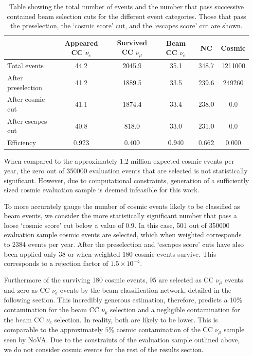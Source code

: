 \begin{table}
    \begin{tabular}{lccccc}
                           & Appeared CC $\nu_{e}$ & Survived CC $\nu_{\mu}$ & Beam CC $\nu_{e}$ & NC    & Cosmic  \\
        \midrule
        Total events       & 44.2                  & 2045.9                  & 35.1              & 348.7 & 1211000 \\
        After preselection & 41.2                  & 1889.5                  & 33.5              & 239.6 & 249260  \\
        After cosmic cut   & 41.1                  & 1874.4                  & 33.4              & 238.0 & 0.0     \\
        After escapes cut  & 40.8                  & 818.0                   & 33.0              & 231.0 & 0.0     \\
        \midrule
        Efficiency         & 0.923                 & 0.400                   & 0.940             & 0.662 & 0.000   \\
    \end{tabular}
    \caption[Number of events passing basic cuts for each event category.]
    {Table showing the total number of events and the number that pass successive contained beam
        selection cuts for the different event categories. Those that pass the preselection, the
        `cosmic score' cut, and the `escapes score' cut are shown.}
    \label{tab:selection}
\end{table}

When compared to the approximately 1.2 million expected cosmic events per year, the zero out of
350000 evaluation events that are selected is not statistically significant. However, due to
computational constraints, generation of a sufficiently sized cosmic evaluation sample is deemed
infeasible for this work.

To more accurately gauge the number of cosmic events likely to be classified as beam events, we
consider the more statistically significant number that pass a loose `cosmic score' cut below a
value of 0.9. In this case, 501 out of 350000 evaluation sample cosmic events are selected, which
when weighted corresponds to 2384 events per year. After the preselection and `escapes score' cuts
have also been applied only 38 or when weighted 180 cosmic events survive. This corresponds to a
rejection factor of $1.5\times10^{-4}$.

Furthermore of the surviving 180 cosmic events, 95 are selected as CC $\nu_{\mu}$ events and zero
as CC $\nu_{e}$ events by the beam classification network, detailed in the following section. This
incredibly generous estimation, therefore, predicts a 10\% contamination for the beam CC
$\nu_{\mu}$ selection and a negligible contamination for the beam CC $\nu_{e}$ selection. In
reality, both are likely to be lower. This is comparable to the approximately $5\%$ cosmic
contamination of the CC $\nu_{\mu}$ sample seen by NoVA. Due to the constraints of the evaluation
sample outlined above, we do not consider cosmic events for the rest of the results section.

